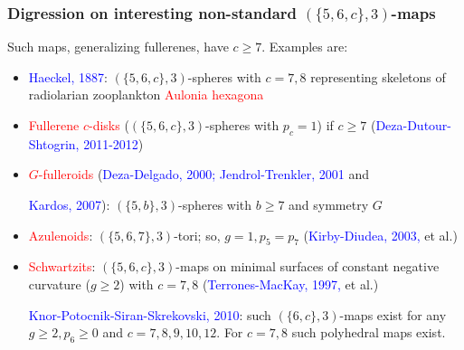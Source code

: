 \documentclass{beamer}
\begin{document}
\begin{frame}\frametitle{Digression on interesting non-standard  
$(\{5,6,c\},3)$-maps}
Such maps, 
generalizing   
 fullerenes, have $c\ge 7$. Examples are: 
\begin{itemize}
\item \textcolor{blue}{Haeckel, 1887}: $(\{5,6,c\},3)$-spheres
 with $c=7,8$ representing
skeletons of  radiolarian zooplankton \textcolor{red}{Aulonia hexagona}
\item \textcolor{red}{Fullerene $c$-disks} ($(\{5,6,c\},3)$-spheres with $p_c=1$) if 
$c\ge 7$ (\textcolor{blue}{Deza-Dutour-Shtogrin, 2011-2012}) 
\item \textcolor{red}{$G$-fulleroids} (\textcolor{blue}{Deza-Delgado, 
2000; Jendrol-Trenkler, 2001} and 

\textcolor{blue}{Kardos, 2007}): $(\{5,b\},3)$-spheres 
with 
$b$$\ge$$ 7$ and 
symmetry $G$

\item \textcolor{red}{Azulenoids}: $(\{5,6,7\},3)$-tori; so, 
$g=1,p_5=p_7$ (\textcolor{blue}{Kirby-Diudea, 2003,} et al.)

\item \textcolor{red}{Schwartzits}: $(\{5,6,c\},3)$-maps on minimal 
surfaces of constant
negative curvature ($g\ge 2$)  with $c=7,8$ (\textcolor{blue}{Terrones-MacKay, 1997,} et 
al.)

 \textcolor{blue}{Knor-Potocnik-Siran-Skrekovski, 2010}: such  
$(\{6,c\},3)$-maps exist for 
any $g\ge 2, p_6\ge 0$ and $c=7,8,9,10,12$. For $c=7,8$ such polyhedral 
maps exist. 
\end{itemize}
 
\end{frame}
\end{document}
